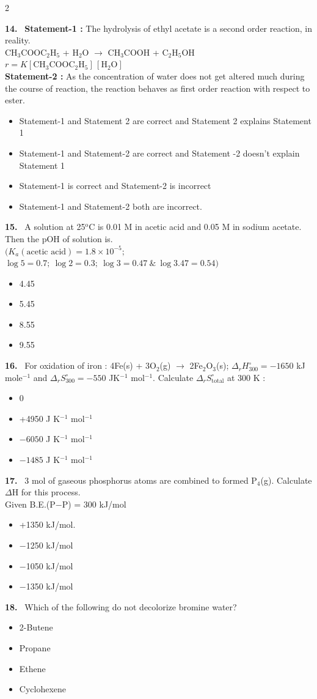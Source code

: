 \documentclass[10pt]{extarticle}
\newcommand{\qn}[1]{\par\smallskip\noindent\textbf{#1.}~}
\newenvironment{qoptions}{\begin{itemize}[leftmargin=1.8em,itemsep=1pt,topsep=2pt,label={}]}{\end{itemize}}
\newcommand{\opt}[2]{\item[(#1)] #2}
\begin{document}
\begin{multicols}{2}
\qn{14} \textbf{Statement-1 :} The hydrolysis of ethyl acetate is a second order reaction, in reality.\\
CH$_3$COOC$_2$H$_5$ + H$_2$O $\to$ CH$_3$COOH + C$_2$H$_5$OH\\
$r=K[\mathrm{CH_3COOC_2H_5}]\,[\mathrm{H_2O}]$\\
\textbf{Statement-2 :} As the concentration of water does not get altered much during the course of reaction, the reaction behaves as first order reaction with respect to ester.
\begin{qoptions}
\opt{A}{Statement-1 and Statement 2 are correct and Statement 2 explains Statement 1}
\opt{B}{Statement-1 and Statement-2 are correct and Statement -2 doesn't explain Statement 1}
\opt{C}{Statement-1 is correct and Statement-2 is incorrect}
\opt{D}{Statement-1 and Statement-2 both are incorrect.}
\end{qoptions}

\qn{15} A solution at 25$^\text{o}$C is 0.01 M in acetic acid and 0.05 M in sodium acetate. Then the pOH of solution is.\\
$\big(K_a(\text{acetic acid})=1.8\times10^{-5};$\\ $\log5=0.7;\ \log2=0.3;\ \log3=0.47\ \&\ \log3.47=0.54\big)$
\begin{qoptions}
\opt{A}{4.45}
\opt{B}{5.45}
\opt{C}{8.55}
\opt{D}{9.55}
\end{qoptions}

\qn{16} For oxidation of iron : 4Fe(s) + 3O$_2$(g) $\to$ 2Fe$_2$O$_3$(s); $\Delta_rH^\circ_{300}=-1650$ kJ mole$^{-1}$ and $\Delta_rS^\circ_{300}=-550$ JK$^{-1}$ mol$^{-1}$. Calculate $\Delta_rS^\circ_{\text{total}}$ at 300 K :
\begin{qoptions}
\opt{A}{0}
\opt{B}{+4950 J K$^{-1}$ mol$^{-1}$}
\opt{C}{$-6050$ J K$^{-1}$ mol$^{-1}$}
\opt{D}{$-1485$ J K$^{-1}$ mol$^{-1}$}
\end{qoptions}

\qn{17} 3 mol of gaseous phosphorus atoms are combined to formed P$_4$(g). Calculate $\Delta$H for this process.\\
Given B.E.(P$-$P) = 300 kJ/mol
\begin{qoptions}
\opt{A}{+1350 kJ/mol.}
\opt{B}{$-$1250 kJ/mol}
\opt{C}{$-$1050 kJ/mol}
\opt{D}{$-$1350 kJ/mol}
\end{qoptions}

\qn{18} Which of the following do not decolorize bromine water?
\begin{qoptions}
\opt{A}{2-Butene}
\opt{B}{Propane}
\opt{C}{Ethene}
\opt{D}{Cyclohexene}
\end{qoptions}


\end{multicols}
\end{document}
